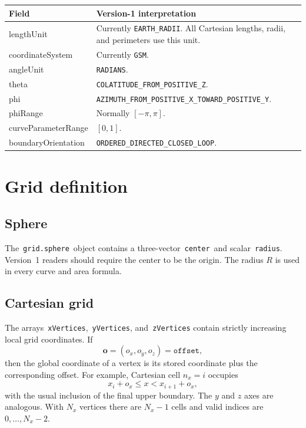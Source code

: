 \documentclass[11pt]{article}
\newcommand{\field}[1]{\texttt{#1}}
\newcommand{\vect}[1]{\boldsymbol{#1}}
\begin{document}
\begin{longtable}{>{\ttfamily}p{}p{}}
\toprule
\normalfont Field & Version-1 interpretation \\
\midrule
\endhead
lengthUnit & Currently \field{EARTH\_RADII}.  All Cartesian lengths, radii,
and perimeters use this unit. \\
coordinateSystem & Currently \field{GSM}. \\
angleUnit & \field{RADIANS}. \\
theta & \field{COLATITUDE\_FROM\_POSITIVE\_Z}. \\
phi & \field{AZIMUTH\_FROM\_POSITIVE\_X\_TOWARD\_POSITIVE\_Y}. \\
phiRange & Normally $[-\pi,\pi]$. \\
curveParameterRange & $[0,1]$. \\
boundaryOrientation & \field{ORDERED\_DIRECTED\_CLOSED\_LOOP}. \\
\bottomrule
\end{longtable}

\section{Grid definition}

\subsection{Sphere}

The \,\field{grid.sphere}\, object contains a three-vector \,\field{center}\,
and scalar \,\field{radius}.  Version~1 readers should require the center to be
the origin.  The radius $R$ is used in every curve and area formula.

\subsection{Cartesian grid}

The arrays \,\field{xVertices}, \,\field{yVertices}, and \,\field{zVertices}
contain strictly increasing local grid coordinates.  If
\[
  \vect{o}=(o_x,o_y,o_z)=\field{offset},
\]
then the global coordinate of a vertex is its stored coordinate plus the
corresponding offset.  For example, Cartesian cell $n_x=i$ occupies
\[
  x_i+o_x \le x < x_{i+1}+o_x,
\]
with the usual inclusion of the final upper boundary.  The $y$ and $z$ axes
are analogous.  With $N_x$ vertices there are $N_x-1$ cells and valid indices
are $0,\ldots,N_x-2$.
\end{document}
